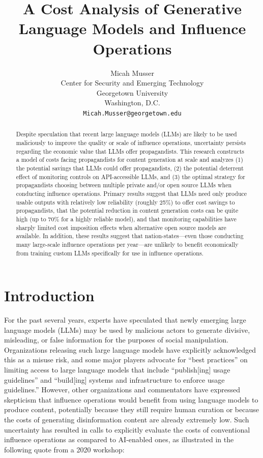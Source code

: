 \documentclass{article}
\title{A Cost Analysis of Generative Language Models and Influence Operations}
\author{
  Micah Musser \\
  Center for Security and Emerging Technology \\
  Georgetown University \\
  Washington, D.C. \\
  \texttt{Micah.Musser@georgetown.edu} \\
}
\begin{document}
\maketitle


\begin{abstract}
Despite speculation that recent large language models (LLMs) are likely to be used maliciously to improve the quality or scale of influence operations, uncertainty persists regarding the economic value that LLMs offer propagandists. This research constructs a model of costs facing propagandists for content generation at scale and analyzes (1) the potential savings that LLMs could offer propagandists, (2) the potential deterrent effect of monitoring controls on API-accessible LLMs, and (3) the optimal strategy for propagandists choosing between multiple private and/or open source LLMs when conducting influence operations. Primary results suggest that LLMs need only produce usable outputs with relatively low reliability (roughly 25\%) to offer cost savings to propagandists, that the potential reduction in content generation costs can be quite high (up to 70\% for a highly reliable model), and that monitoring capabilities have sharply limited cost imposition effects when alternative open source models are available. In addition, these results suggest that nation-states—even those conducting many large-scale influence operations per year—are unlikely to benefit economically from training custom LLMs specifically for use in influence operations.
\end{abstract}




\section{Introduction} 

For the past several years, experts have speculated that newly emerging large language models (LLMs) may be used by malicious actors to generate divisive, misleading, or false information for the purposes of social manipulation. \cite{CRESTreport, propasservice, CSETreport, workshop, kreps, middlebury, withsecure, sedova2} Organizations releasing such large language models have explicitly acknowledged this as a misuse risk, \cite{radford, deepmind} and some major players advocate for ``best practices'' on limiting access to large language models that include ``publish[ing] usage guidelines'' and ``build[ing] systems and infrastructure to enforce usage guidelines.'' \cite{cohere} However, other organizations and commentators have expressed skepticism that influence operations would benefit from using language models to produce content, potentially because they still require human curation or because the costs of generating disinformation content are already extremely low. \cite{gpt3, lazar, eleuther, snakeoil, releasestrats} Such uncertainty has resulted in calls to explicitly evaluate the costs of conventional influence operations as compared to AI-enabled ones, as illustrated in the following quote from a 2020 workshop:
\end{document}

